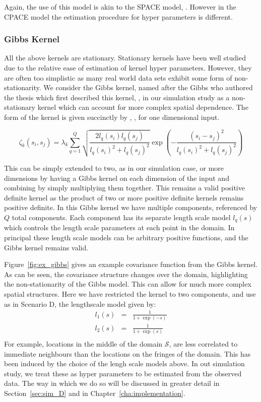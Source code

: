 Again, the use of this model is akin to the SPACE model, \citep{liu_functional_2017}.
However in the CPACE model the estimation procedure for hyper parameters is different.

\subsubsection{Gibbs Kernel \label{sssec:gibbs}}
All the above kernels are stationary.
Stationary kernels have been well studied due to the relative ease of estimation of kernel hyper parameters.
However, they are often too simplistic as many real world data sets exhibit some form of non-stationarity.
We consider the Gibbs kernel, named after the Gibbs who authored the thesis which first described this kernel, \citep{gibbs_bayesian_nodate}, in our simulation study as a non-stationary kernel which can account for more complex spatial dependence.
The form of the kernel is given succinctly by \citeauthor{paciorek_spatial_2006}, \citep{paciorek_spatial_2006}, for one dimensional input. 

\begin{equation}
	\zeta_k\left(s_{i}, s_{j}\right) = \lambda_k \sum_{q=1}^{Q} \sqrt{\frac{2l_q(s_i)l_q(s_j)}{l_q(s_i)^2 + l_q(s_j)^2}} \exp \left(-\frac{\left(s_i - s_j\right)^2}{l_q(s_i)^2 + l_q(s_j)^2}\right)
\end{equation}

This can be simply extended to two, as in our simulation case, or more dimensions by having a Gibbs kernel on each dimension of the input and combining by simply multiplying them together.
This remains a valid positive definite kernel as the product of two or more positive definite kernels remains positive definite. 
In this Gibbs kernel we have multiple components, referenced by $Q$ total components.
Each component has its separate length scale model $l_q(s)$ which controls the length scale parameters at each point in the domain.
In principal these length scale models can be arbitrary positive functions, and the Gibbs kernel remains valid.

Figure~\ref{fig:ex_gibbs} gives an example covariance function from the Gibbs kernel.
As can be seen, the covariance structure changes over the domain, highlighting the non-stationarity of the Gibbs model.
This can allow for much more complex spatial structures.
Here we have restricted the kernel to two components, and use as in Scenario D, the lengthscale model given by:
\begin{eqnarray}
	l_1(s) &=& \frac{1}{1 + \exp(-s)} \nonumber \\
	l_2(s) &=& \frac{1}{1 +  \exp(s)} \nonumber \\
\end{eqnarray}
For example, locations in the middle of the domain $\mathcal{S}$, are less correlated to immediate neighbours than the locations on the fringes of the domain.
This has been induced by the choice of the lengh scale models above.
In out simulation study, we treat these as hyper parameters to be estimated from the observed data.
The way in which we do so will be discussed in greater detail in Section~\ref{sec:sim_D} and in Chapter~\ref{cha:implementation}.

